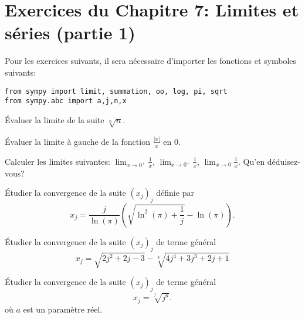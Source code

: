 
\section*{Exercices du Chapitre 7: Limites et séries (partie 1)}

Pour les exercices suivants, il sera nécessaire d'importer les fonctions
et symboles suivants:
\begin{verbatim}
from sympy import limit, summation, oo, log, pi, sqrt
from sympy.abc import a,j,n,x
\end{verbatim}

\begin{exercice}
    Évaluer la limite de la suite $\sqrt[n]{n}$.
\end{exercice}

\begin{exercice}
    Évaluer la limite à gauche de la fonction $\frac{|x|}{x}$ en 0.
\end{exercice}

\begin{exercice}
    Calculer les limites suivantes: 
    $\lim_{x\to0^+}\frac{1}{x}$,\hspace{5pt}
    $\lim_{x\to0^-}\frac{1}{x}$,\hspace{5pt}
    $\lim_{x\to0}\frac{1}{x}$.
    Qu'en déduisez-vous?
\end{exercice}


\begin{exercice}
  \'Etudier la convergence de la suite $(x_j)_j$ d\'efinie par
\[
  x_j = \frac{j}{\ln(\pi)} \left(\sqrt{\ln^2(\pi)+\frac{1}{j}}-
\ln(\pi)\right).
\]
\end{exercice}

\begin{exercice}
Étudier la convergence de la suite $(x_j)_j$ de terme g\'en\'eral
\[
x_j= \sqrt{2 j^2 +2j-3} - \sqrt[4]{4 j^4 + 3j^3 +2 j +1}
\]
\end{exercice}


\begin{exercice}
  Étudier la convergence de la suite $(x_j)_j$ de terme g\'en\'eral
  \[
  x_j=  \sqrt[j]{j^a}.
\]
où $a$ est un paramètre réel.
\end{exercice}

